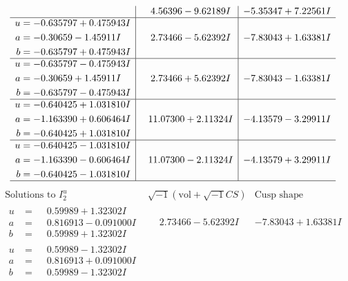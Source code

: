 \documentclass[1p]{elsarticle_modified}
\theoremstyle{definition}
\newcommand{\I}{\sqrt{-1}}
\begin{document}
$$\begin{array}{c|c|c}
 & \phantom{-}4.56396 - 9.62189 I & -5.35347 + 7.22561 I \\ \hline\begin{aligned}
u &= -0.635797 + 0.475943 I \\
a &= -0.30659 - 1.45911 I \\
b &= -0.635797 + 0.475943 I\end{aligned}
 & \phantom{-}2.73466 - 5.62392 I & -7.83043 + 1.63381 I \\ \hline\begin{aligned}
u &= -0.635797 - 0.475943 I \\
a &= -0.30659 + 1.45911 I \\
b &= -0.635797 - 0.475943 I\end{aligned}
 & \phantom{-}2.73466 + 5.62392 I & -7.83043 - 1.63381 I \\ \hline\begin{aligned}
u &= -0.640425 + 1.031810 I \\
a &= -1.163390 + 0.606464 I \\
b &= -0.640425 + 1.031810 I\end{aligned}
 & \phantom{-}11.07300 + 2.11324 I & -4.13579 - 3.29911 I \\ \hline\begin{aligned}
u &= -0.640425 - 1.031810 I \\
a &= -1.163390 - 0.606464 I \\
b &= -0.640425 - 1.031810 I\end{aligned}
 & \phantom{-}11.07300 - 2.11324 I & -4.13579 + 3.29911 I\\
 \hline 
 \end{array}$$\newpage$$\begin{array}{c|c|c}  
\text{Solutions to }I^u_{2}& \I (\text{vol} + \sqrt{-1}CS) & \text{Cusp shape}\\
 \hline 
\begin{aligned}
u &= \phantom{-}0.59989 + 1.32302 I \\
a &= \phantom{-}0.816913 - 0.091000 I \\
b &= \phantom{-}0.59989 + 1.32302 I\end{aligned}
 & \phantom{-}2.73466 - 5.62392 I & -7.83043 + 1.63381 I \\ \hline\begin{aligned}
u &= \phantom{-}0.59989 - 1.32302 I \\
a &= \phantom{-}0.816913 + 0.091000 I \\
b &= \phantom{-}0.59989 - 1.32302 I\end{aligned}

\end{array}$$
\end{document}
